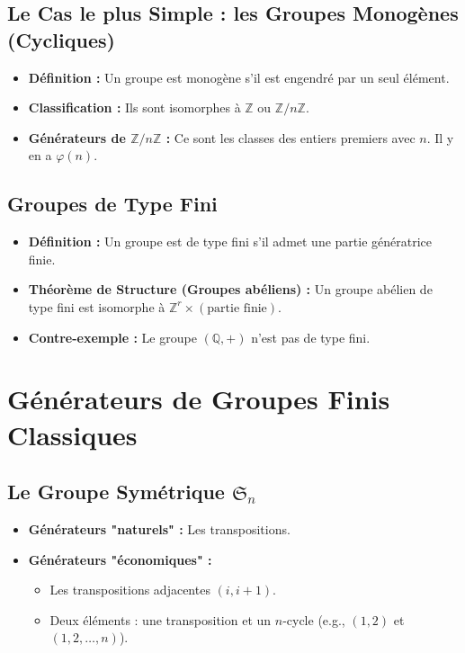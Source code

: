 \documentclass[12pt, a4paper, parskip=full]{report}
\theoremstyle{agregstyle}
\begin{document}
\subsection{Le Cas le plus Simple : les Groupes Monogènes (Cycliques)}
\begin{itemize}
    \item \textbf{Définition :} Un groupe est monogène s'il est engendré par un seul élément.
    \item \textbf{Classification :} Ils sont isomorphes à $\mathbb{Z}$ ou $\mathbb{Z}/n\mathbb{Z}$.
    \item \textbf{Générateurs de $\mathbb{Z}/n\mathbb{Z}$ :} Ce sont les classes des entiers premiers avec $n$. Il y en a $\varphi(n)$.
\end{itemize}
\subsection{Groupes de Type Fini}
\begin{itemize}
    \item \textbf{Définition :} Un groupe est de type fini s'il admet une partie génératrice finie.
    \item \textbf{Théorème de Structure (Groupes abéliens) :} Un groupe abélien de type fini est isomorphe à $\mathbb{Z}^r \times (\text{partie finie})$.
    \item \textbf{Contre-exemple :} Le groupe $(\mathbb{Q},+)$ n'est pas de type fini.
\end{itemize}

\section{Générateurs de Groupes Finis Classiques}
\subsection{Le Groupe Symétrique $\mathfrak{S}_n$}
\begin{itemize}
    \item \textbf{Générateurs "naturels" :} Les transpositions.
    \item \textbf{Générateurs "économiques" :}
        \begin{itemize}
            \item Les transpositions adjacentes $(i, i+1)$.
            \item Deux éléments : une transposition et un $n$-cycle (e.g., $(1,2)$ et $(1,2,\dots,n)$).
        \end{itemize}
\end{itemize}
\end{document}
